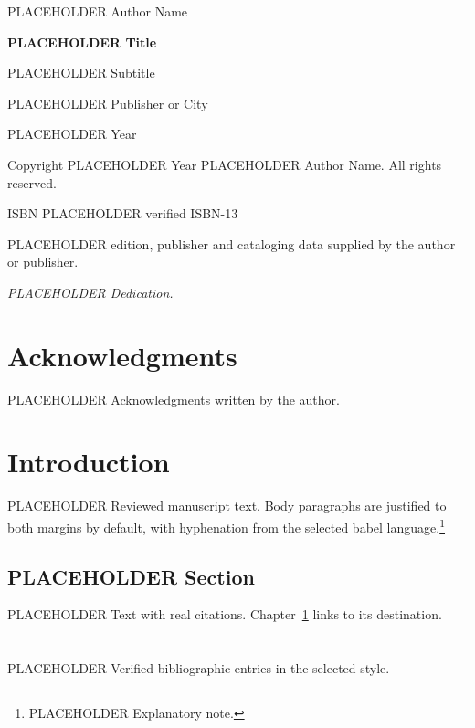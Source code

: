 \documentclass[12pt,a4paper,twoside,openright]{book}
\begin{document}
\frontmatter

\thispagestyle{empty}
\begin{center}
\vspace*{40mm}
{\Large PLACEHOLDER Author Name\par}
\vspace{30mm}
{\huge\bfseries PLACEHOLDER Title\par}
\vspace{6mm}
{\Large PLACEHOLDER Subtitle\par}
\vfill
{\large PLACEHOLDER Publisher or City\par}
{\large PLACEHOLDER Year\par}
\end{center}
\clearpage

\thispagestyle{empty}
\vspace*{\fill}
\noindent Copyright \textcopyright{} PLACEHOLDER Year PLACEHOLDER Author Name. All rights reserved.

\noindent ISBN PLACEHOLDER verified ISBN-13

\noindent PLACEHOLDER edition, publisher and cataloging data supplied by the author or publisher.
\clearpage

\thispagestyle{empty}
\vspace*{\fill}
\begin{flushright}
\itshape PLACEHOLDER Dedication.
\end{flushright}
\clearpage

\chapter*{Acknowledgments}
PLACEHOLDER Acknowledgments written by the author.

\listoffigures
\listoftables
\tableofcontents

\mainmatter

\chapter{Introduction}
\label{chapter:introduction}

PLACEHOLDER Reviewed manuscript text. Body paragraphs are justified to both margins by default, with hyphenation from the selected babel language.\footnote{PLACEHOLDER Explanatory note.}

\section{PLACEHOLDER Section}

PLACEHOLDER Text with real citations. Chapter~\ref{chapter:introduction} links to its destination.

\backmatter
\chapter*{\bibname}

{\raggedright
PLACEHOLDER Verified bibliographic entries in the selected style.
\par}
\end{document}
